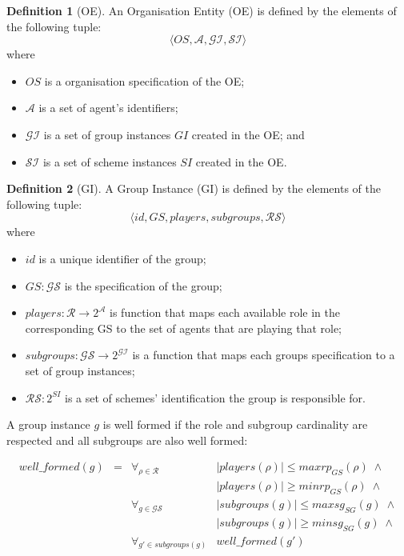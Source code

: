 \documentclass{article}
\newcommand{\set}[1]{\mathcal{#1}}
\theoremstyle{definition} \newtheorem{definition}{Definition}
\begin{document}
\begin{definition}[OE]
  An Organisation Entity (OE) is defined by the elements of the following tuple: 
  \begin{displaymath}
    \langle OS,  \mathcal{A}, \mathcal{GI}, \mathcal{SI} \rangle    
  \end{displaymath}
  where 
  \begin{itemize}
  \item $OS$ is a organisation specification of the OE;
  \item $\mathcal{A}$ is a set of agent's identifiers;
  \item $\mathcal{GI}$ is a set of group instances $GI$ created in the OE; and
  \item $\mathcal{SI}$ is a set of scheme instances $SI$ created in the OE.
  \end{itemize}  
\end{definition}

\begin{definition}[GI]
  A Group Instance (GI) is defined by the elements of the following tuple: 
  \begin{displaymath}
    \langle id, GS, players, subgroups, \set{RS} \rangle
  \end{displaymath}
  where 
  \begin{itemize}
  \item $id$ is a unique identifier of the group;
  \item $GS : \set{GS}$ is the specification of the group;
  \item $players : \set{R} \rightarrow 2^{\set{A}}$ is
    function that maps each available role in the corresponding GS
    to the set of agents that are playing that role;
  \item $subgroups: \set{GS} \rightarrow 2^{\set{GI}}$ is a
    function that maps each groups specification to a set of group
    instances;
  \item $\set{RS} : 2^{SI}$ is a set of schemes' identification the group is
    responsible for.
  \end{itemize}  
\end{definition}

A group instance $g$ is well formed if the role and subgroup cardinality are
respected and all subgroups are also well formed:

\begin{displaymath}
  \begin{array}{rcll}
  well\_formed(g) & = & \forall_{\rho \in \set{R}} & |players(\rho)| \leq maxrp_{GS}(\rho) \; \land \\
                              & & &  |players(\rho)| \geq minrp_{GS}(\rho) \; \land\\
                              & &  \forall_{g \in \set{GS}} & |subgroups(g)| \leq maxsg_{SG}(g) \; \land\\
                              & & & |subgroups(g)| \geq minsg_{SG}(g) \; \land\\
                              & &  \forall_{g' \in subgroups(g)} & well\_formed(g')
  \end{array}
\end{displaymath}
\end{document}
